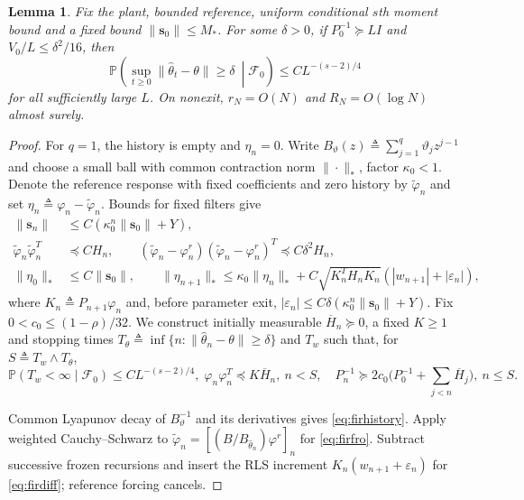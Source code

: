 \documentclass[11pt,reqno]{amsart}
\numberwithin{equation}{section}
\newtheorem{lemma}[theorem]{Lemma}
\theoremstyle{definition}
\theoremstyle{remark}
\newcommand{\Prob}{\mathbb P}
\newcommand{\F}{\mathcal F}
\newcommand{\thh}{\widehat\theta}
\newcommand{\ph}{\varphi}
\begin{document}
\begin{lemma}\label{lem:firbounded}
Fix the plant, bounded reference, uniform conditional $s$th moment bound and a fixed bound $\|\mathbf s_0\|\le M_*$. For some $\delta>0$, if $P_0^{-1}\succeq LI$ and $V_0/L\le\delta^2/16$, then
\begin{equation}\label{eq:firnonexit}
 \Prob\left(\sup_{t\ge0}\|\thh_t-\theta\|\ge\delta\ \middle|\F_0\right)
 \le CL^{-(s-2)/4}
\end{equation}
for all sufficiently large $L$. On nonexit, $r_N=O(N)$ and $R_N=O(\log N)$ almost surely.
\end{lemma}
\begin{proof}
For $q=1$, the history is empty and $\eta_n=0$. Write $B_\vartheta(z)\triangleq\sum_{j=1}^q\vartheta_jz^{j-1}$ and choose a small ball with common contraction norm $\|\cdot\|_*$, factor $\kappa_0<1$. Denote the reference response with fixed coefficients and zero history by $\widetilde\ph_n$ and set $\eta_n\triangleq\ph_n-\widetilde\ph_n$.
Bounds for fixed filters give
\begin{align}
 \|\mathbf s_n\|&\le C(\kappa_0^n\|\mathbf s_0\|+Y),\label{eq:firhistory}\\
 \widetilde\ph_n\widetilde\ph_n^T&\preceq CH_n,\qquad
 (\widetilde\ph_n-\ph_n^r)(\widetilde\ph_n-\ph_n^r)^T\preceq C\delta^2H_n,\label{eq:firfro}\\
 \|\eta_0\|_*&\le C\|\mathbf s_0\|,\qquad
 \|\eta_{n+1}\|_*\le\kappa_0\|\eta_n\|_*+
 C\sqrt{K_n^T H_nK_n}(|w_{n+1}|+|\varepsilon_n|),\label{eq:firdiff}
\end{align}
where $K_n\triangleq P_{n+1}\ph_n$ and, before parameter exit,
$|\varepsilon_n|\le C\delta(\kappa_0^n\|\mathbf s_0\|+Y)$.
Fix $0<c_0\le(1-\rho)/32$. We construct initially measurable $\overline H_n\succeq0$, a fixed $K\ge1$
and stopping times $T_\theta\triangleq\inf\{n:\|\thh_n-\theta\|\ge\delta\}$ and $T_w$ such that, for $S\triangleq T_w\wedge T_\theta$,
\begin{equation*}
 \Prob(T_w<\infty\mid\F_0)\le CL^{-(s-2)/4},\;
 \ph_n\ph_n^T\preceq K\overline H_n,\ n<S,\quad
 P_n^{-1}\succeq2c_0\bigl(P_0^{-1}+\sum_{j<n}\overline H_j\bigr),\ n\le S.
\end{equation*}

Common Lyapunov decay of $B_\vartheta^{-1}$ and its derivatives gives \eqref{eq:firhistory}. Apply weighted Cauchy--Schwarz to $\widetilde\ph_n=[(B/B_{\thh_n})\ph^r]_n$ for \eqref{eq:firfro}. Subtract successive frozen recursions and insert the RLS increment $K_n(w_{n+1}+\varepsilon_n)$ for \eqref{eq:firdiff}; reference forcing cancels.


\end{proof}
\end{document}
